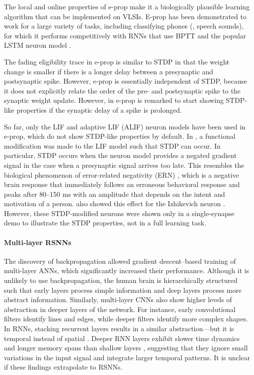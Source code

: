 The local and online properties of e-prop make it a biologically plausible learning algorithm that can be implemented on VLSIs.
E-prop has been demonstrated to work for a large variety of tasks, including classifying phones (\ie, speech sounds), for which it performs competitively with RNNs that use BPTT and the popular LSTM neuron model \citep{graves2013speech}.

The fading eligibility trace in e-prop is similar to STDP in that the weight change is smaller if there is a longer delay between a presynaptic and postsynaptic spike.
However, e-prop is essentially independent of STDP, because it does not explicitly relate the order of the pre- and postsynaptic spike to the synaptic weight update.
However, in \citet{bellec2020solution} e-prop is remarked to start showing STDP-like properties if the synaptic delay of a spike is prolonged.

So far, only the LIF and adaptive LIF (ALIF) neuron models have been used in e-prop, which do not show STDP-like properties by default.
In \citet{traub2020learning}, a functional modification was made to the LIF model such that STDP can occur.
In particular, STDP occurs when the neuron model provides a negated gradient signal in the case when a presynaptic signal arrives too late.
This resembles the biological phenomenon of error-related negativity (ERN) \citep{nieuwenhuis2001error}, which is a negative brain response that immediately follows an erroneous behavioral response and peaks after 80--150 ms with an amplitude that depends on the intent and motivation of a person.
\citet{traub2020learning} also showed this effect for the Izhikevich neuron \citep{izhikevich2003simple}.
However, these STDP-modified neurons were shown only in a single-synapse demo to illustrate the STDP properties, not in a full learning task.

\paragraph{Multi-layer RSNNs}

The discovery of backpropagation allowed gradient descent--based training of multi-layer ANNs, which significantly increased their performance.
Although it is unlikely to use backpropagation, the human brain is hierarchically structured such that early layers process simple information and deep layers process more abstract information.
Similarly, multi-layer CNNs also show higher levels of abstraction in deeper layers of the network.
For instance, early convolutional filters identify lines and edges, while deeper filters identify more complex shapes.
In RNNs, stacking recurrent layers results in a similar abstraction---but it is temporal instead of spatial \citep{hermans2013training,gallicchio2017deep}.
Deeper RNN layers exhibit slower time dynamics and longer memory spans than shallow layers \citep{gallicchio2018short}, suggesting that they ignore small variations in the input signal and integrate larger temporal patterns.
It is unclear if these findings extrapolate to RSNNs.

